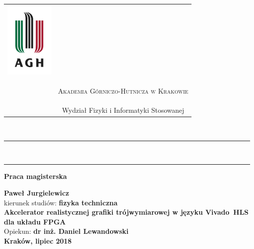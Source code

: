 \documentclass[a4paper, 12pt, twoside]{book}
\numberwithin{equation}{section}
\begin{document}
\begin{table}[H]
\resizebox{\textwidth}{!} {
\begin{tabular}{cc}
\multirow{2}{*}{\includegraphics[height=37.5mm]{img/agh.jpg}} & 
\phantom{tmp} \\ 
& \phantom{tmp} \\

& {
\begin{small}
\textsc{Akademia Górniczo-Hutnicza w Krakowie}
\end{small}} \\ 
& {\small{Wydział Fizyki i Informatyki Stosowanej}}
\end{tabular}
}
\end{table}
~\\ %
\rule{\textwidth}{3pt}\\
\rule[2ex]
\textwidth{1pt}\\
\vspace{7ex}
\begin{center}
{\bf\LARGE{Praca magisterska}}\\
\vspace{13ex}




{\bf\Large{Paweł Jurgielewicz}}\\
\vspace{3ex}
{ \small kierunek studiów:} {\bf\normalsize{fizyka techniczna}}\\
\vspace{10ex}
{\bf\LARGE{
Akcelerator realistycznej grafiki trójwymiarowej w języku Vivado~HLS dla układu FPGA
}}\\
\vspace{14ex}
{ \Large {Opiekun:}} {\bf\Large{dr inż. Daniel Lewandowski}}\\
\vspace{18ex}
\bf\large{Kraków, lipiec 2018}
\end{center}
\newpage
\thispagestyle{empty}
\end{document}
